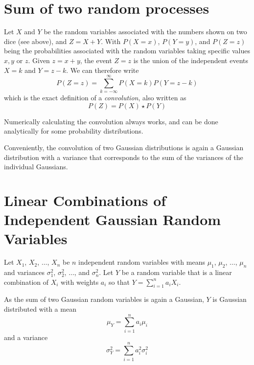 \section{Sum of two random processes}\label{sec:convolution}
Let $X$ and $Y$ be the random variables associated with the numbers shown on two dice (see above), and $Z=X+Y$. With $P(X=x)$, $P(Y=y)$, and $P(Z=z)$ being the probabilities associated with the random variables taking specific values $x,y$ or $z$. Given $z=x+y$, the event $Z=z$ is the union of the independent events $X=k$ and $Y=z-k$. We can therefore write
\begin{equation}
P(Z=z)=\sum_{k=-\infty}^{\infty}P(X=k)P(Y=z-k)
\end{equation}
which is the exact definition of a \textsl{convolution}, also written as
\begin{equation}
P(Z)=P(X)\star P(Y)
\end{equation}

Numerically calculating the convolution always works, and can be done analytically for some probability distributions.

Conveniently, the convolution of two Gaussian distributions is again a Gaussian distribution with a variance that corresponds to the sum of the variances of the individual Gaussians.

\section{Linear Combinations of Independent Gaussian Random Variables}\label{sec:lcombrandom}
Let $X_1$, $X_2$, $\ldots$, $X_n$ be $n$ independent random variables with means $\mu_1$, $\mu_2$, $\ldots$, $\mu_n$ and variances $\sigma_1^2$, $\sigma_2^2$, $\ldots$, and $\sigma^2_n$. Let $Y$ be a random variable that is a linear combination of $X_i$ with weights $a_i$ so that $Y=\sum_{i=1}^na_iX_i$.

As the sum of two Gaussian random variables is again a Gaussian, $Y$ is Gaussian distributed with a mean \begin{equation}
\mu_Y=\sum_{i=1}^na_i\mu_i
\end{equation}
and a variance
\begin{equation}
\sigma_Y^2=\sum_{i=1}^na_i^2\sigma_i^2
\end{equation}



